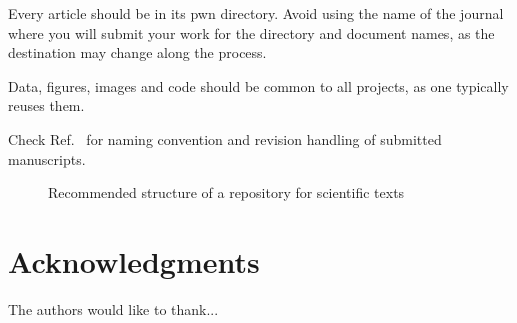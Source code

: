 \documentclass[journal]{IEEEtran}
\begin{document}
Every article should be in its pwn directory.
Avoid using the name of the journal where you will submit your work for the directory and document names, as the destination may change along the process.

Data, figures, images and code should be common to all projects, as one typically reuses them.

Check Ref.~\cite{EditorialGRSL2015} for naming convention and revision handling of submitted manuscripts.

\begin{figure}[hbt]
\centering

\caption{Recommended structure of a repository for scientific texts}\label{Fig:StructRepo}
\end{figure}

	
\section*{Acknowledgments}
The authors would like to thank...
	
\nocite{StatisticalAnalysesReproducibleResearch,%
RRComputationalHarmonicAnalysis,%
RREconometrics,%
RRSignalProcessing,%
AddressingNeedDataCodeSharingComputationalScience,%
ReproducibleResearchinComputationalScience,%
TenRulesReproducibleComputationalResearch,%
ManifestoReproducibleScience}
	


	
	
\end{document}
